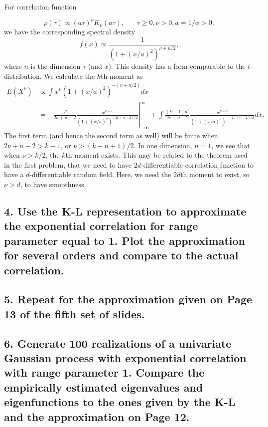 \documentclass[12pt]{article}
\begin{document}
For correlation function

\[ \rho(\tau) \propto (a\tau)^\nu K_\nu(a\tau),~~~~~~~~\tau\geq0,\nu>0,a=1/\phi>0, \]
we have the corresponding spectral density
\[ f(x) \propto \frac{1}{\left(1+(x/a)^2\right)^{\nu+n/2}}, \]
where $n$ is the dimension $\tau$ (and $x$). This density has a form comparable to the $t$-distribution. We calculate the $k$th moment as
\begin{align*}
E(X^k) &\propto \int x^k(1+(x/a)^2)^{-(\nu+n/2)} dx \\
 &= \left.-\frac{a^2}{2\nu+n-2}\frac{x^{k-1}}{(1+(x/a)^2)^{(2\nu+n-2)/2}}\right\vert_{-\infty}^{\infty}+\int\frac{(k-1)a^2}{2\nu+n-2}\frac{x^{k-2}}{(1+(x/a)^2)^{-(2\nu+n-2)/2}} dx.
\end{align*}
The first term (and hence the second term as well) will be finite when $2\nu+n-2>k-1$, or $\nu>(k-n+1)/2$. In one dimension, $n=1$, we see that when $\nu > k/2$, the $k$th moment exists. This may be related to the theorem used in the first problem, that we need to have $2d$-differentiable correlation function to have a $d$-differentiable random field. Here, we need the $2d$th moment to exist, so $\nu>d$, to have smoothness.





\subsection*{4. Use the K-L representation to approximate the exponential correlation for range parameter equal to 1. Plot the approximation for several orders and compare to the actual correlation.}

\subsection*{5. Repeat for the approximation given on Page 13 of the fifth set of slides.}

\subsection*{6. Generate 100 realizations of a univariate Gaussian process with exponential correlation with range parameter 1. Compare the empirically estimated eigenvalues and eigenfunctions to the ones given by the K-L and the approximation on Page 12.}
\end{document}
